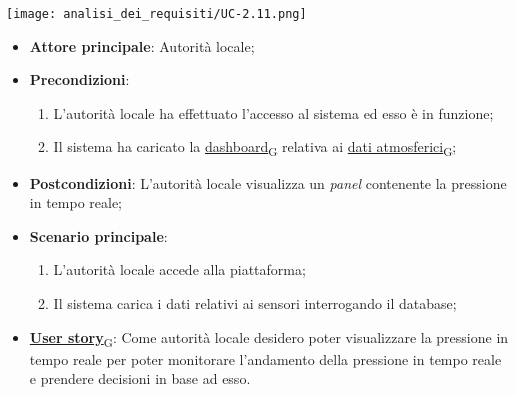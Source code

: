 \begin{center}
	\texttt{[image: analisi\_dei\_requisiti/UC-2.11.png]}
\end{center}
\begin{itemize}
	\item \textbf{Attore principale}: Autorità locale;
	\item \textbf{Precondizioni}:
	      \begin{enumerate}
		      \item L'autorità locale ha effettuato l'accesso al sistema ed esso è in funzione;
		      \item Il sistema ha caricato la \href{https://7last.github.io/docs/rtb/documentazione-interna/glossario\#dashboard}{dashboard\textsubscript{G}} relativa ai \href{https://7last.github.io/docs/rtb/documentazione-interna/glossario\#dati-atmosferici}{dati atmosferici\textsubscript{G}};
	      \end{enumerate}
	\item \textbf{Postcondizioni}: L'autorità locale visualizza un \textit{panel} contenente la pressione in tempo reale;
	\item \textbf{Scenario principale}:
	      \begin{enumerate}
		      \item L'autorità locale accede alla piattaforma;
		      \item Il sistema carica i dati relativi ai sensori interrogando il database;
	      \end{enumerate}
	\item \href{https://7last.github.io/docs/rtb/documentazione-interna/glossario\#user-story}{\textbf{User story}\textsubscript{G}}: Come autorità locale desidero poter visualizzare la pressione in tempo reale per poter monitorare
	      l'andamento della pressione in tempo reale e prendere decisioni in base ad esso.
\end{itemize}

